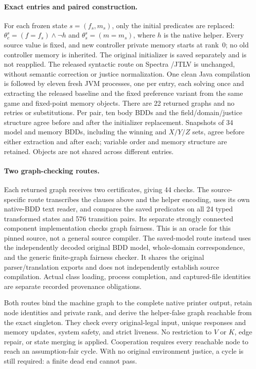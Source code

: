 \paragraph{Exact entries and paired construction.}
For each frozen state $s=(f_s,m_s)$, only the initial predicates are replaced:
$\theta_e^s=(f=f_s)\land\neg h$ and $\theta_s^s=(m=m_s)$, where $h$
is the native helper. Every source value is fixed, and new controller
private memory starts at rank~0; no old controller memory is inherited.
The original initializer is saved separately and is not reapplied.
The released syntactic route on Spectra /JTLV
is unchanged, without semantic correction or justice normalization.
One clean Java compilation is followed by eleven fresh JVM processes,
one per entry, each solving once and extracting the released baseline
and the fixed preference variant from the same game and fixed-point
memory objects. There are 22 returned graphs and no retries or substitutions.
Per pair, ten body BDDs and the field/domain/justice structure agree
before and after the initializer replacement. Snapshots of 34 model and
memory BDDs, including the winning and $X/Y/Z$ sets, agree before either
extraction and after each; variable order and memory structure are retained.
Objects are not shared across different entries.

\paragraph{Two graph-checking routes.}
Each returned graph receives two certificates, giving 44 checks.
The source-specific route transcribes the clauses above and the helper
encoding, uses its own native-BDD text reader, and compares the saved
predicates on all 24 typed transformed states and 576 transition pairs.
Its separate strongly connected component implementation checks graph
fairness. This is an oracle for this pinned source, not a general source
compiler. The saved-model route instead uses the independently decoded
original BDD model, whole-domain correspondence, and the generic finite-graph
fairness checker. It shares the original parser/translation exports and
does not independently establish source compilation. Actual class loading,
process completion, and captured-file identities are separate recorded
provenance obligations.

Both routes bind the machine graph to the complete native printer output,
retain node identities and private rank, and derive the helper-false graph
reachable from the exact singleton. They check every original-legal input,
unique responses and memory updates, system safety, and strict liveness.
No restriction to $V$ or $K$, edge repair, or state merging is applied.
Cooperation requires every reachable node to reach an assumption-fair
cycle. With no original environment justice, a cycle is still required:
a finite dead end cannot pass.

